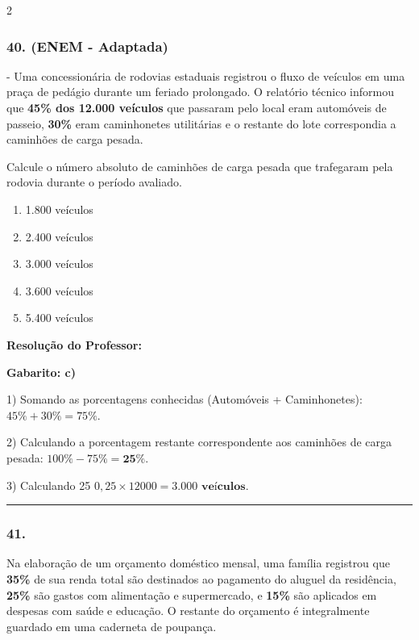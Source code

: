 \begin{multicols*}{2}
\subsubsection*{40. (ENEM - Adaptada)} - Uma concessionária de rodovias estaduais registrou o fluxo de veículos em uma praça de pedágio durante um feriado prolongado. O relatório técnico informou que \textbf{45\% dos 12.000 veículos} que passaram pelo local eram automóveis de passeio, \textbf{30\%} eram caminhonetes utilitárias e o restante do lote correspondia a caminhões de carga pesada.

Calcule o número absoluto de caminhões de carga pesada que trafegaram pela rodovia durante o período avaliado.
\begin{enumerate}[label=\alph*), itemsep=\espacoAlt]
    \item 1.800 veículos
    \item 2.400 veículos
    \item 3.000 veículos
    \item 3.600 veículos
    \item 5.400 veículos
\end{enumerate}

\ifgabarito
    \begin{tcolorbox}[colback=CorTitUm!5, colframe=CorTitUm, boxrule=1pt, arc=4pt, left=6pt, right=6pt, top=6pt, bottom=6pt]
    \small\textbf{\textcolor{CorTitUm}{Resolução do Professor:}}\par\vspace{0.1cm}
    \color{CinzaEscuro}
    \textbf{Gabarito: c)}
    
    1) Somando as porcentagens conhecidas (Automóveis + Caminhonetes):
    $45\% + 30\% = 75\%$.
    
    2) Calculando a porcentagem restante correspondente aos caminhões de carga pesada:
    $100\% - 75\% = \textbf{25\%}$.
    
    3) Calculando 25%
    $0,25 \times 12000 = \mathbf{3.000\text{ veículos}}$.
    \end{tcolorbox}
\fi

\par\vspace{\espacoQuestao}
\noindent\textcolor{CorLinha}{\rule{\linewidth}{0.5pt}} 
\par\vspace{\espacoPreQuestao}
\subsubsection*{41.} Na elaboração de um orçamento doméstico mensal, uma família registrou que \textbf{35\%} de sua renda total são destinados ao pagamento do aluguel da residência, \textbf{25\%} são gastos com alimentação e supermercado, e \textbf{15\%} são aplicados em despesas com saúde e educação. O restante do orçamento é integralmente guardado em uma caderneta de poupança.


\end{multicols*}
